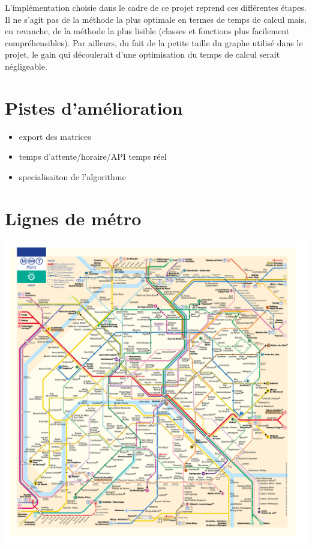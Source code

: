 \documentclass[,french]{article}
\begin{document}
L'implémentation choisie dans le cadre de ce projet reprend ces
différentes étapes. Il ne s'agit pas de la méthode la plus optimale en
termes de temps de calcul mais, en revanche, de la méthode la plus
lisible (classes et fonctions plus facilement compréhensibles). Par
ailleurs, du fait de la petite taille du graphe utilisé dans le projet,
le gain qui découlerait d'une optimisation du temps de calcul serait
négligeable.

\hypertarget{sec:amelioration}{%
\section{Pistes d'amélioration}\label{sec:amelioration}}

\begin{itemize}
\item
  export des matrices
\item
  temps d'attente/horaire/API temps réel
\item
  specialisaiton de l'algorithme
\end{itemize}

\hypertarget{sec:lignes_metro}{%
\section{Lignes de métro}\label{sec:lignes_metro}}

\includegraphics{img/plan_lignes/Plan-Metro.pdf}
\end{document}
